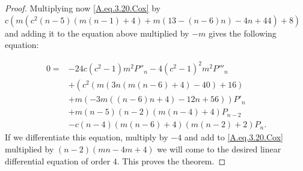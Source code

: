 \documentclass[review,nopreprintline]{elsarticle}
\theoremstyle{definition}
\numberwithin{equation}{section}
\theoremstyle{remark}
\begin{document}
\begin{proof}
	       Multiplying now \eqref{A.eq.3.20.Cox} by $c \left(m \left(c^2 (n-5) (m (n-1)+4)+m (13-(n-6) n)-4 n+44\right)+8\right)$ and adding it to  the equation above multiplied by $-m$   gives the following equation:
	       
	        \begin{align*}
	            0=&-24 c \left(c^2-1\right) m^2 P''_n -4 \left(c^2-1\right)^2 m^2 P'''_n \\
	            &+\left(c^2 (m (3 n (m (n-6)+4)-40)+16)\right.\\
	            &\left.+m (-3 m ((n-6) n+4)-12 n+56)\right)  P'_n \\
	            &+m (n-5) (n-2) (m (n-4)+4) P_{n-2} \\
	            &-c (n-4) (m (n-6)+4) (m (n-2)+2) P_n.
	        \end{align*}
	        If we differentiate this equation, multiply
	        by $-4$ and add to \eqref{A.eq.3.20.Cox} multiplied by $(n-2) (m n-4m+4)$ we will come
	          to  the desired  linear differential equation of  order $4$. This proves the theorem.
	      
	     \end{proof} 
	      
	
	      
\end{document}
